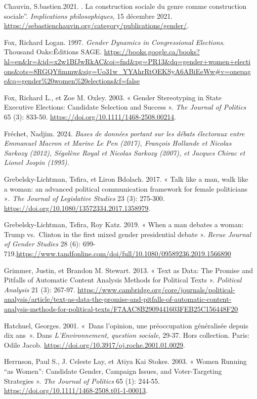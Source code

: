 \documentclass[
  letterpaper,
  DIV=11,
  numbers=noendperiod]{scrartcl}
\begin{document}
Chauvin, S.bastien.2021. . La construction sociale du genre comme
construction sociale''. \emph{Implications philosophiques,} 15 décembre
2021. \url{https://sebastienchauvin.org/category/publications/gender/}.

Fox, Richard Logan. 1997. \emph{Gender Dynamics in Congressional
Elections}. Thousand Oaks:Éditions SAGE.
\url{https://books.google.ca/books?hl=en\&lr=\&id=x2w1BfJwRkAC\&oi=fnd\&pg=PR13\&dq=gender+women+elections\&ots=8RGQYfimmw\&sig=Uo31w_YYAhrRtOEKSyA6ABiEeWw\#v=onepage\&q=gender\%20women\%20elections\&f=false}

Fox, Richard L., et Zoe M. Oxley. 2003. « Gender Stereotyping in State
Executive Elections: Candidate Selection and Success ». \emph{The
Journal of Politics} 65 (3): 833-50.
\url{https://doi.org/10.1111/1468-2508.00214}.

Fréchet, Nadjim. 2024. \emph{Bases de données portant sur les débats
électoraux entre Emmanuel Macron et Marine Le Pen (2017), François
Hollande et Nicolas Sarkozy (2012), Ségolène Royal et Nicolas Sarkozy
(2007), et Jacques Chirac et Lionel Jospin (1995).}

Grebelsky-Lichtman, Tsfira, et Liron Bdolach. 2017. « Talk like a man,
walk like a woman: an advanced political communication framework for
female politicians »\emph{. The Journal of} \emph{Legislative Studies}
23 (3): 275-300\emph{.}
\url{https://doi.org/10.1080/13572334.2017.1358979}.

Grebelsky-Lichtman, Tsfira, Roy Katz. 2019. « When a man debates a
woman: Trump vs.~Clinton in the first mixed gender presidential debate
». \emph{Revue Journal of Gender Studies} 28 (6):
699-719.\url{https://www.tandfonline.com/doi/full/10.1080/09589236.2019.1566890}

Grimmer, Justin, et Brandon M. Stewart. 2013. « Text as Data: The
Promise and Pitfalls of Automatic Content Analysis Methods for Political
Texts ». \emph{Political Analysis} 21 (3): 267‑97.
\url{https://www.cambridge.org/core/journals/political-analysis/article/text-as-data-the-promise-and-pitfalls-of-automatic-content-analysis-methods-for-political-texts/F7AAC8B2909441603FEB25C156448F20}

Hatchuel, Georges. 2001. «~Dans l'opinion, une préoccupation généralisée
depuis dix ans~». Dans \emph{L'Environnement, question sociale}, 29‑37.
Hors collection. Paris: Odile Jacob.
\url{https://doi.org/10.3917/oj.roche.2001.01.0029}.

Herrnson, Paul S., J. Celeste Lay, et Atiya Kai Stokes. 2003. « Women
Running ``as Women'': Candidate Gender, Campaign Issues, and
Voter-Targeting Strategies ». \emph{The Journal of Politics} 65 (1):
244‑55. \url{https://doi.org/10.1111/1468-2508.t01-1-00013}.
\end{document}

